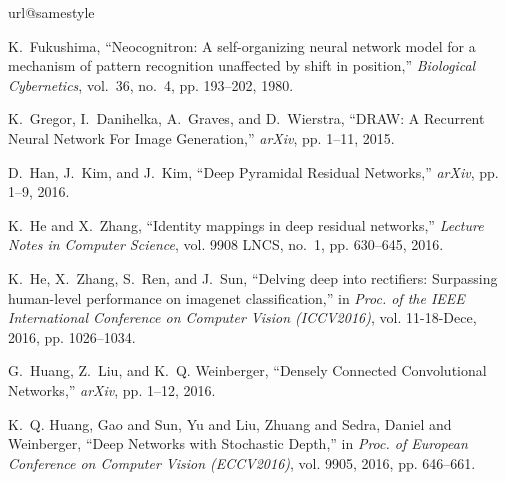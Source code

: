 \documentclass[journal]{IEEEtran}
\begin{document}
\begin{thebibliography}{10}
\providecommand{\url}[1]{#1}
\csname url@samestyle\endcsname
\providecommand{\newblock}{\relax}
\providecommand{\bibinfo}[2]{#2}
\providecommand{\BIBentrySTDinterwordspacing}{\spaceskip=0pt\relax}
\providecommand{\BIBentryALTinterwordstretchfactor}{4}
\providecommand{\BIBentryALTinterwordspacing}{\spaceskip=\fontdimen2\font plus
\BIBentryALTinterwordstretchfactor\fontdimen3\font minus
  \fontdimen4\font\relax}
\providecommand{\BIBforeignlanguage}[2]{{%
\expandafter\ifx\csname l@#1\endcsname\relax
\typeout{** WARNING: IEEEtranS.bst: No hyphenation pattern has been}%
\typeout{** loaded for the language `#1'. Using the pattern for}%
\typeout{** the default language instead.}%
\else
\language=\csname l@#1\endcsname
\fi
#2}}
\providecommand{\BIBdecl}{\relax}
\BIBdecl

K.~Fukushima, ``{Neocognitron: A self-organizing neural network model for a
  mechanism of pattern recognition unaffected by shift in position},''
  \emph{Biological Cybernetics}, vol.~36, no.~4, pp. 193--202, 1980.

K.~Gregor, I.~Danihelka, A.~Graves, and D.~Wierstra, ``{DRAW: A Recurrent
  Neural Network For Image Generation},'' \emph{arXiv}, pp. 1--11, 2015.

D.~Han, J.~Kim, and J.~Kim, ``{Deep Pyramidal Residual Networks},''
  \emph{arXiv}, pp. 1--9, 2016.

K.~He and X.~Zhang, ``{Identity mappings in deep residual networks},''
  \emph{Lecture Notes in Computer Science}, vol. 9908 LNCS, no.~1, pp.
  630--645, 2016.

K.~He, X.~Zhang, S.~Ren, and J.~Sun, ``{Delving deep into rectifiers:
  Surpassing human-level performance on imagenet classification},'' in
  \emph{Proc. of the IEEE International Conference on Computer Vision
  (ICCV2016)}, vol. 11-18-Dece, 2016, pp. 1026--1034.

G.~Huang, Z.~Liu, and K.~Q. Weinberger, ``{Densely Connected Convolutional
  Networks},'' \emph{arXiv}, pp. 1--12, 2016.

K.~Q. {Huang, Gao and Sun, Yu and Liu, Zhuang and Sedra, Daniel and
  Weinberger}, ``{Deep Networks with Stochastic Depth},'' in \emph{Proc. of
  European Conference on Computer Vision (ECCV2016)}, vol. 9905, 2016, pp.
  646--661.


\end{thebibliography}
\end{document}
